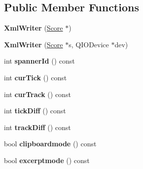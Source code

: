 \subsection*{Public Member Functions}
\begin{DoxyCompactItemize}
\item 
\mbox{\label{class_ms_1_1_xml_writer_a839d94b5bdd5f0b1b5e684823fa2171e}} 
{\bfseries Xml\+Writer} (\hyperlink{class_ms_1_1_score}{Score} $\ast$)
\item 
\mbox{\label{class_ms_1_1_xml_writer_a0a6c4bec6444dade78d4a7bbd10e5a8e}} 
{\bfseries Xml\+Writer} (\hyperlink{class_ms_1_1_score}{Score} $\ast$s, Q\+I\+O\+Device $\ast$dev)
\item 
\mbox{\label{class_ms_1_1_xml_writer_a2df60ed2159b7d1b7509095473e5d7db}} 
int {\bfseries spanner\+Id} () const
\item 
\mbox{\label{class_ms_1_1_xml_writer_aa70da0192ce2217aff1779abfe0ead06}} 
int {\bfseries cur\+Tick} () const
\item 
\mbox{\label{class_ms_1_1_xml_writer_a38b428167b868eef3fb465902c2e3c88}} 
int {\bfseries cur\+Track} () const
\item 
\mbox{\label{class_ms_1_1_xml_writer_a9057c7c989356e2d2dd71fb4575cdf6d}} 
int {\bfseries tick\+Diff} () const
\item 
\mbox{\label{class_ms_1_1_xml_writer_a690e864b4b4c07c485c381d52826ba98}} 
int {\bfseries track\+Diff} () const
\item 
\mbox{\label{class_ms_1_1_xml_writer_af591a2ff0de93d49622b61a63b62e710}} 
bool {\bfseries clipboardmode} () const
\item 
\mbox{\label{class_ms_1_1_xml_writer_a575dbaa781e0ce5ba2ce3bbce9ccb0e4}} 
bool {\bfseries excerptmode} () const
\item 
\mbox{\label{class_ms_1_1_xml_writer_a26fbd883f9023255a33477f390116a05}} 

\end{DoxyCompactItemize}

